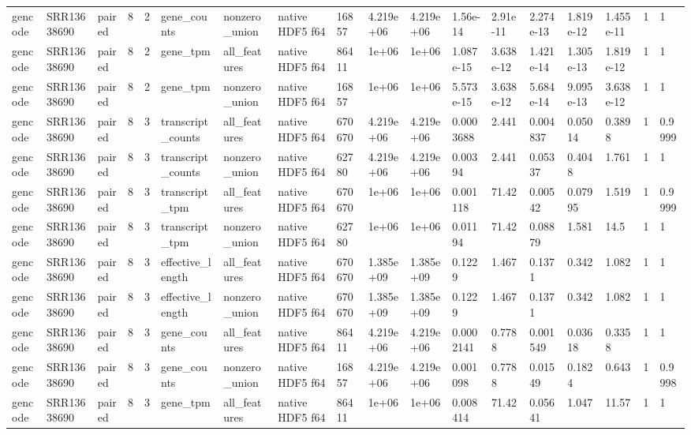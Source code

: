 \begin{tabular}{llllllllllllllllll}
gencode & SRR13638690 & paired & 8 & 2 & gene\_counts & nonzero\_union & native HDF5 f64 & 16857 & 4.219e+06 & 4.219e+06 & 1.56e-14 & 2.91e-11 & 2.274e-13 & 1.819e-12 & 1.455e-11 & 1 & 1 \\
gencode & SRR13638690 & paired & 8 & 2 & gene\_tpm & all\_features & native HDF5 f64 & 86411 & 1e+06 & 1e+06 & 1.087e-15 & 3.638e-12 & 1.421e-14 & 1.305e-13 & 1.819e-12 & 1 & 1 \\
gencode & SRR13638690 & paired & 8 & 2 & gene\_tpm & nonzero\_union & native HDF5 f64 & 16857 & 1e+06 & 1e+06 & 5.573e-15 & 3.638e-12 & 5.684e-14 & 9.095e-13 & 3.638e-12 & 1 & 1 \\
gencode & SRR13638690 & paired & 8 & 3 & transcript\_counts & all\_features & native HDF5 f64 & 670670 & 4.219e+06 & 4.219e+06 & 0.0003688 & 2.441 & 0.004837 & 0.05014 & 0.3898 & 1 & 0.9999 \\
gencode & SRR13638690 & paired & 8 & 3 & transcript\_counts & nonzero\_union & native HDF5 f64 & 62780 & 4.219e+06 & 4.219e+06 & 0.00394 & 2.441 & 0.05337 & 0.4048 & 1.761 & 1 & 1 \\
gencode & SRR13638690 & paired & 8 & 3 & transcript\_tpm & all\_features & native HDF5 f64 & 670670 & 1e+06 & 1e+06 & 0.001118 & 71.42 & 0.00542 & 0.07995 & 1.519 & 1 & 0.9999 \\
gencode & SRR13638690 & paired & 8 & 3 & transcript\_tpm & nonzero\_union & native HDF5 f64 & 62780 & 1e+06 & 1e+06 & 0.01194 & 71.42 & 0.08879 & 1.581 & 14.5 & 1 & 1 \\
gencode & SRR13638690 & paired & 8 & 3 & effective\_length & all\_features & native HDF5 f64 & 670670 & 1.385e+09 & 1.385e+09 & 0.1229 & 1.467 & 0.1371 & 0.342 & 1.082 & 1 & 1 \\
gencode & SRR13638690 & paired & 8 & 3 & effective\_length & nonzero\_union & native HDF5 f64 & 670670 & 1.385e+09 & 1.385e+09 & 0.1229 & 1.467 & 0.1371 & 0.342 & 1.082 & 1 & 1 \\
gencode & SRR13638690 & paired & 8 & 3 & gene\_counts & all\_features & native HDF5 f64 & 86411 & 4.219e+06 & 4.219e+06 & 0.0002141 & 0.7788 & 0.001549 & 0.03618 & 0.3358 & 1 & 1 \\
gencode & SRR13638690 & paired & 8 & 3 & gene\_counts & nonzero\_union & native HDF5 f64 & 16857 & 4.219e+06 & 4.219e+06 & 0.001098 & 0.7788 & 0.01549 & 0.1824 & 0.643 & 1 & 0.9998 \\
gencode & SRR13638690 & paired & 8 & 3 & gene\_tpm & all\_features & native HDF5 f64 & 86411 & 1e+06 & 1e+06 & 0.008414 & 71.42 & 0.05641 & 1.047 & 11.57 & 1 & 1 \\

\end{tabular}
